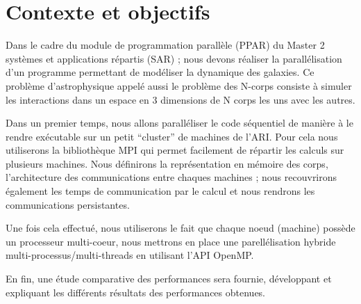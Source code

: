 \section{Contexte et objectifs}
\par Dans le cadre du module de programmation parallèle (PPAR)
du Master 2 systèmes et applications répartis (SAR) ; nous devons réaliser
la parallélisation d'un programme permettant de modéliser la dynamique des galaxies.
Ce problème d'astrophysique appelé aussi le problème des N-corps consiste à 
simuler les interactions dans un espace en 3 dimensions de N corps les uns avec
les autres.\\
\par Dans un premier temps, nous allons paralléliser le code séquentiel de manière 
à le rendre exécutable sur un petit ``cluster'' de machines de l'ARI. Pour cela nous 
utiliserons la bibliothèque MPI qui permet facilement de répartir les calculs sur 
plusieurs machines. Nous définirons la représentation en mémoire des corps, l'architecture des
communications entre chaques machines ; nous recouvrirons également les temps de 
communication par le calcul et nous rendrons les communications persistantes.\\
\par Une fois cela effectué, nous utiliserons le fait que chaque noeud (machine)
possède un processeur multi-coeur, nous mettrons en place une parellélisation hybride
multi-processus/multi-threads en utilisant l'API OpenMP.\\
\par En fin, une étude comparative des performances sera fournie,
développant et expliquant les différents résultats des performances obtenues.\\
